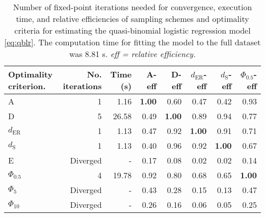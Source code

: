 \begin{table}[htb!]
\centering
\caption{Number of fixed-point iterations needed for convergence, execution time, and relative efficiencies of sampling schemes and optimality criteria for estimating the quasi-binomial logistic regression model \eqref{eq:qblr}. The computation time for fitting the model to the full dataset was 8.81 s. \textit{eff = relative efficiency.}} 
\label{tab:impact_speed_response_surface}
\begin{tabular}{lrrrrrrr}
 Optimality criterion. & No. iterations & Time (s) & A-eff & D-eff & $d_{\mathrm{ER}}$-eff & $d_{\mathrm{S}}$-eff & $\Phi_{0.5}$-eff \\ 
  \hline
A & 1 & 1.16 & \textbf{1.00} & 0.60 & 0.47 & 0.42 & 0.93 \\ 
  D & 5 & 26.58 & 0.49 & \textbf{1.00} & 0.89 & 0.94 & 0.77 \\ 
  $d_{\mathrm{ER}}$ & 1 & 1.13 & 0.47 & 0.92 & \textbf{1.00} & 0.91 & 0.71 \\ 
  $d_{\mathrm{S}}$ & 1 & 1.13 & 0.40 & 0.96 & 0.92 & \textbf{1.00} & 0.67 \\ 
  E & Diverged & - & 0.17 & 0.08 & 0.02 & 0.02 & 0.14 \\ 
  $\Phi_{0.5}$ & 4 & 19.78 & 0.92 & 0.80 & 0.68 & 0.65 & \textbf{1.00} \\ 
  $\Phi_5$ & Diverged & - & 0.43 & 0.28 & 0.15 & 0.13 & 0.47 \\ 
  $\Phi_{10}$ & Diverged & - & 0.26 & 0.16 & 0.06 & 0.05 & 0.25 \\ 
   \hline
\end{tabular}
\end{table}
